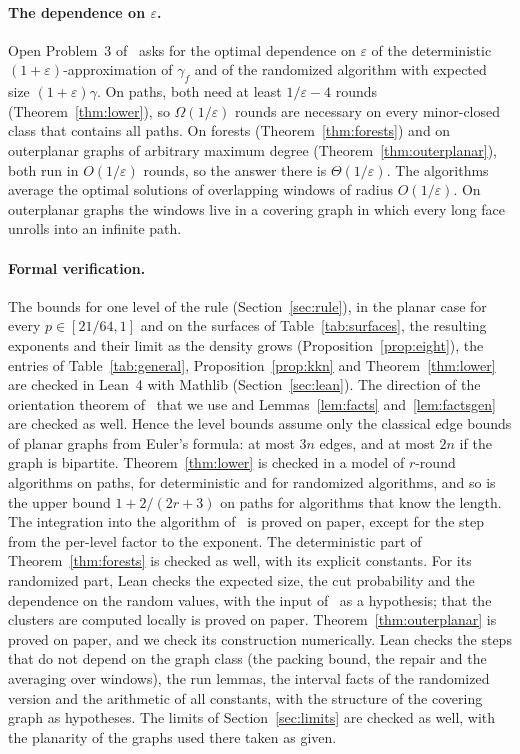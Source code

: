 \documentclass[11pt]{article}
\theoremstyle{remark}
\begin{document}
\paragraph{The dependence on $\varepsilon$.} Open Problem~3 of~\cite{AS26} asks for the optimal
dependence on $\varepsilon$ of the deterministic $(1+\varepsilon)$-approximation of $\gamma_f$ and of
the randomized algorithm with expected size $(1+\varepsilon)\gamma$. On paths, both need at least
$1/\varepsilon-4$ rounds (Theorem~\ref{thm:lower}), so $\Omega(1/\varepsilon)$ rounds are necessary
on every minor-closed class that contains all paths. On forests (Theorem~\ref{thm:forests}) and on
outerplanar graphs of arbitrary maximum degree (Theorem~\ref{thm:outerplanar}), both run in
$O(1/\varepsilon)$ rounds, so the answer there is $\Theta(1/\varepsilon)$. The algorithms average the
optimal solutions of overlapping windows of radius $O(1/\varepsilon)$. On outerplanar graphs the
windows live in a covering graph in which every long face unrolls into an infinite path.

\paragraph{Formal verification.} The bounds for one level of the rule (Section~\ref{sec:rule}), in the
planar case for every $p\in[21/64,1]$ and on the surfaces of Table~\ref{tab:surfaces}, the resulting
exponents and their limit as the density grows (Proposition~\ref{prop:eight}), the entries of
Table~\ref{tab:general}, Proposition~\ref{prop:kkn} and Theorem~\ref{thm:lower} are checked in Lean~4
with Mathlib (Section~\ref{sec:lean}). The direction
of the orientation theorem of~\cite{H65} that we use and Lemmas~\ref{lem:facts}
and~\ref{lem:factsgen} are checked as well. Hence the level bounds assume only the classical edge
bounds of planar graphs from Euler's formula: at most $3n$ edges, and at most $2n$ if the graph is
bipartite. Theorem~\ref{thm:lower} is checked in a model of
$r$-round algorithms on paths, for deterministic and for randomized algorithms, and so is the
upper bound $1+2/(2r+3)$ on paths for algorithms that know the length. The integration into the algorithm of~\cite{AS26} is proved on paper, except
for the step from the per-level factor to the exponent. The deterministic part of
Theorem~\ref{thm:forests} is checked as well, with its explicit constants. For its randomized part,
Lean checks the expected size, the cut probability and the dependence on the random values, with the
input of~\cite{LOW08} as a hypothesis; that the clusters are computed locally is proved on paper.
Theorem~\ref{thm:outerplanar} is proved on paper, and we check its construction numerically. Lean
checks the steps that do not depend on the graph class (the packing bound, the repair and the
averaging over windows), the run lemmas, the interval facts of the randomized version and the
arithmetic of all constants, with the structure of the covering graph as hypotheses. The limits of
Section~\ref{sec:limits} are checked as well, with the planarity of the graphs used there taken as
given.
\end{document}
